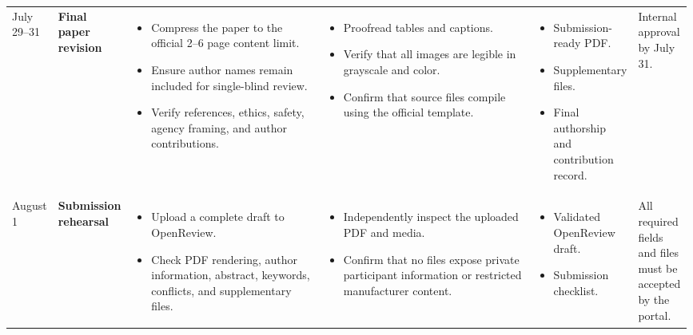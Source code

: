 \documentclass{article}
\begin{document}
\begin{landscape}
\begin{longtable}{
    L{0.05\linewidth}
    L{0.08\linewidth}
    L{0.3\linewidth}
    L{0.33\linewidth}
    L{0.15\linewidth}
    L{0.08\linewidth}
}
July 29--31
&
\textbf{Final paper revision}
&
\begin{itemize}[leftmargin=*,nosep]
    \item Compress the paper to the official 2--6 page content limit.
    \item Ensure author names remain included for single-blind review.
    \item Verify references, ethics, safety, agency framing,
    and author contributions.
\end{itemize}
&
\begin{itemize}[leftmargin=*,nosep]
    \item Proofread tables and captions.
    \item Verify that all images are legible in grayscale and color.
    \item Confirm that source files compile using the official template.
\end{itemize}
&
\begin{itemize}[leftmargin=*,nosep]
    \item Submission-ready PDF.
    \item Supplementary files.
    \item Final authorship and contribution record.
\end{itemize}
&
Internal approval by July 31.
\\

August 1
&
\textbf{Submission rehearsal}
&
\begin{itemize}[leftmargin=*,nosep]
    \item Upload a complete draft to OpenReview.
    \item Check PDF rendering, author information, abstract,
    keywords, conflicts, and supplementary files.
\end{itemize}
&
\begin{itemize}[leftmargin=*,nosep]
    \item Independently inspect the uploaded PDF and media.
    \item Confirm that no files expose private participant information
    or restricted manufacturer content.
\end{itemize}
&
\begin{itemize}[leftmargin=*,nosep]
    \item Validated OpenReview draft.
    \item Submission checklist.
\end{itemize}
&
All required fields and files must be accepted by the portal.
\\


\end{longtable}
\end{landscape}
\end{document}

